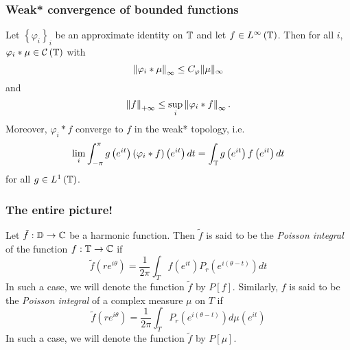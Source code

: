 \subsubsection{Weak* convergence of bounded functions}
\begin{theorem}
    Let $\left\{ \varphi _{i} \right\}_{i}$ be an approximate identity on $\mathbb T$ and let $f\in L^{\infty} \left( \mathbb T \right)$. Then for all $i$, $\varphi_{i} * \mu  \in {\cal C} \left( \mathbb T \right)$ with
    \begin{equation*}
	\left\lVert \varphi _{i} * \mu \right\rVert_{\infty} \le C_{\varphi} \lVert \mu \rVert _{\infty}
    \end{equation*}
    and
    \begin{equation*}
	\left\lVert f \right\rVert_{+\infty} \le \sup_{i} \left\lVert \varphi_{i} * f \right\rVert_{\infty}\text{.}
    \end{equation*}
    Moreover, $\varphi_{i} * f$ converge to $f$ in the weak* topology, i.e.
    \begin{equation*}
    \lim_{i} \int_{-\pi}^{\pi} g\left( e^{it} \right) \left( \varphi_{i} * f \right) \left( e^{it} \right) dt = \int_{\mathbb T} g\left( e^{it} \right) f \left( e^{it} \right) dt 
    \end{equation*}
    for all $g \in L^{1} \left( \mathbb T \right)$.
    \label{thm:weak-star-infinity}
\end{theorem}

\subsubsection{The entire picture!}

\begin{definition}
    Let $\tilde{f} : \mathbb D \to \mathbb C$ be a harmonic function. Then $\tilde{f}$ is said to be the \textit{Poisson integral} of the function $f : \mathbb T \to \mathbb C$ if
    \begin{equation*}
	\tilde{f} (re^{i\theta}) = \frac{1}{2\pi} \int_{T} f\left( e^{it} \right) P_{r} \left( e^{i\left( \theta-t \right)} \right) dt
    \end{equation*}
    In such a case, we will denote the function $\tilde{f}$ by $P[f]$.
    Similarly, $f$ is said to be the \textit{Poisson integral} of a complex measure $\mu$ on $T$ if
\begin{equation*}
    \tilde{f} (re^{i\theta}) = \frac{1}{2\pi} \int_{T} P_{r} \left( e^{i\left( \theta-t \right)} \right) d\mu\left( e^{it} \right)
    \end{equation*}In such a case, we will denote the function $\tilde{f}$ by $P[\mu]$.
    \label{def:Poisson-Integral-Of-Some-Function-Or-Measure}
\end{definition}

